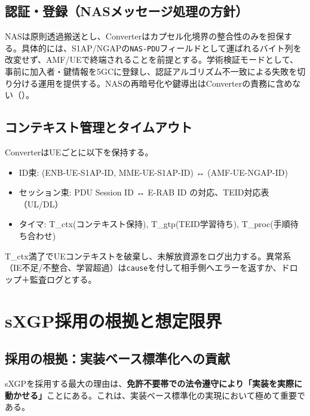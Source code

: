 \subsection{認証・登録（NASメッセージ処理の方針）}
NASは原則透過搬送とし、Converterはカプセル化境界の整合性のみを担保する。具体的には、S1AP/NGAPの\texttt{NAS-PDU}フィールドとして運ばれるバイト列を改変せず、AMF/UEで終端されることを前提とする。学術検証モードとして、事前に加入者・鍵情報を5GCに登録し、認証アルゴリズム不一致による失敗を切り分ける運用を提供する。NASの再暗号化や鍵導出はConverterの責務に含めない（\cite{threegpp-23501}）。

\subsection{コンテキスト管理とタイムアウト}
ConverterはUEごとに以下を保持する。
\begin{itemize}
	\item ID束: (ENB-UE-S1AP-ID, MME-UE-S1AP-ID) ↔ (AMF-UE-NGAP-ID)
	\item セッション束: PDU Session ID ↔ E-RAB ID の対応、TEID対応表（UL/DL）
	\item タイマ: T\_ctx(コンテキスト保持), T\_gtp(TEID学習待ち), T\_proc(手順待ち合わせ)
\end{itemize}
T\_ctx満了でUEコンテキストを破棄し、未解放資源をログ出力する。異常系（IE不足/不整合、学習超過）は\texttt{cause}を付して相手側へエラーを返すか、ドロップ＋監査ログとする。

\section{sXGP採用の根拠と想定限界}
\subsection{採用の根拠：実装ベース標準化への貢献}

sXGPを採用する最大の理由は、\textbf{免許不要帯での法令遵守により「実装を実際に動かせる」}ことにある。これは、実装ベース標準化の実現において極めて重要である。

